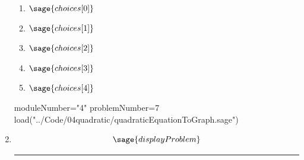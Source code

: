 \documentclass[14pt]{extbook}
\newcommand{\litem}[1]{\item#1\hspace*{-1cm}\rule{\textwidth}{0.4pt}}
\begin{document}
\begin{enumerate}
{  	\begin{enumerate}[label=\Alph*.]
    \item \( \sage{choices[0]} \)
    \item \( \sage{choices[1]} \)
    \item \( \sage{choices[2]} \)
    \item \( \sage{choices[3]} \)
    \item \( \sage{choices[4]} \)
  	\end{enumerate}
  }

\begin{sagesilent}
moduleNumber="4"
problemNumber=7
load("../Code/04quadratic/quadraticEquationToGraph.sage")
\end{sagesilent}

\litem{ 

\[ \sage{displayProblem} \]

}
\end{enumerate}
\end{document}
